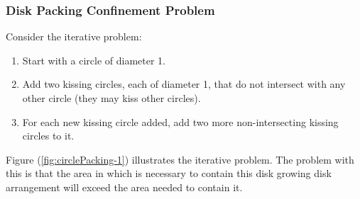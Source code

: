 \subsubsection{Disk Packing Confinement Problem}
Consider the iterative problem:
\begin{enumerate}%
\item Start with a circle of diameter 1.
\item Add two kissing circles, each of diameter 1, that do not intersect with any other circle (they may kiss other
circles).
\item For each new kissing circle added, add two more non-intersecting kissing circles to it.
\end{enumerate} 
Figure (\ref{fig:circlePacking-1}) illustrates the iterative problem.  The problem with this is that the area in
which is necessary to contain this disk growing disk arrangement will exceed the area needed to contain it.

